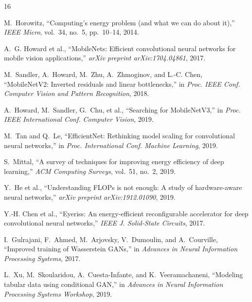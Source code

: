 \documentclass[conference]{IEEEtran}
\begin{document}
\begin{thebibliography}{16}

M.~Horowitz, ``Computing's energy problem (and what we can do about it),''
\emph{IEEE Micro}, vol.~34, no.~5, pp.~10--14, 2014.

A.~G. Howard et al., ``MobileNets: Efficient convolutional neural networks for
mobile vision applications,'' \emph{arXiv preprint arXiv:1704.04861}, 2017.

M.~Sandler, A.~Howard, M.~Zhu, A.~Zhmoginov, and L.-C. Chen,
``MobileNetV2: Inverted residuals and linear bottlenecks,'' in
\emph{Proc. IEEE Conf. Computer Vision and Pattern Recognition}, 2018.

A.~Howard, M.~Sandler, G.~Chu, et al., ``Searching for MobileNetV3,'' in
\emph{Proc. IEEE International Conf. Computer Vision}, 2019.

M.~Tan and Q.~Le, ``EfficientNet: Rethinking model scaling for convolutional
neural networks,'' in \emph{Proc. International Conf. Machine Learning}, 2019.

S.~Mittal, ``A survey of techniques for improving energy efficiency of deep
learning,'' \emph{ACM Computing Surveys}, vol.~51, no.~2, 2019.

Y.~He et al., ``Understanding FLOPs is not enough: A study of hardware-aware
neural networks,'' \emph{arXiv preprint arXiv:1912.01090}, 2019.

Y.-H. Chen et al., ``Eyeriss: An energy-efficient reconfigurable accelerator
for deep convolutional neural networks,'' \emph{IEEE J. Solid-State Circuits},
2017.

I.~Gulrajani, F.~Ahmed, M.~Arjovsky, V.~Dumoulin, and A.~Courville,
``Improved training of Wasserstein GANs,'' in \emph{Advances in Neural
Information Processing Systems}, 2017.

L.~Xu, M.~Skoularidou, A.~Cuesta-Infante, and K.~Veeramachaneni, ``Modeling
tabular data using conditional GAN,'' in \emph{Advances in Neural Information
Processing Systems Workshop}, 2019.

\end{thebibliography}
\end{document}
